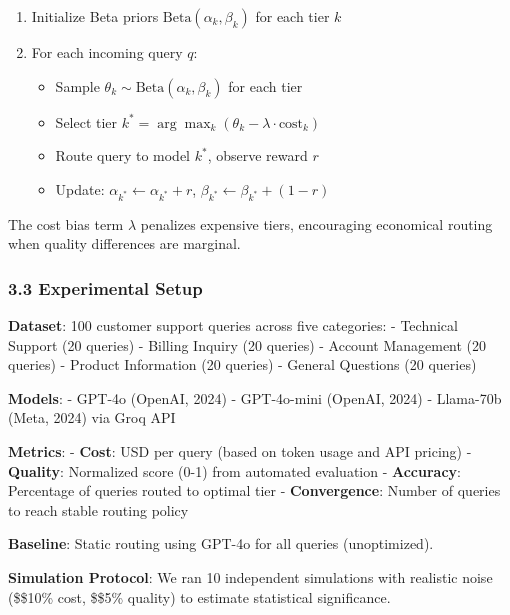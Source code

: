 \documentclass[
]{article}
\providecommand{\tightlist}{%
  \setlength{\itemsep}{0pt}\setlength{\parskip}{0pt}}
\begin{document}
\begin{enumerate}
\def\labelenumi{\arabic{enumi}.}
\tightlist
\item
  Initialize Beta priors \(\text{Beta}(\alpha_k, \beta_k)\) for each
  tier \(k\)
\item
  For each incoming query \(q\):

  \begin{itemize}
  \tightlist
  \item
    Sample \(\theta_k \sim \text{Beta}(\alpha_k, \beta_k)\) for each
    tier
  \item
    Select tier
    \(k^* = \arg\max_k (\theta_k - \lambda \cdot \text{cost}_k)\)
  \item
    Route query to model \(k^*\), observe reward \(r\)
  \item
    Update: \(\alpha_{k^*} \leftarrow \alpha_{k^*} + r\),
    \(\beta_{k^*} \leftarrow \beta_{k^*} + (1-r)\)
  \end{itemize}
\end{enumerate}

The cost bias term \(\lambda\) penalizes expensive tiers, encouraging
economical routing when quality differences are marginal.

\hypertarget{experimental-setup}{%
\subsubsection{3.3 Experimental Setup}\label{experimental-setup}}

\textbf{Dataset}: 100 customer support queries across five categories: -
Technical Support (20 queries) - Billing Inquiry (20 queries) - Account
Management (20 queries) - Product Information (20 queries) - General
Questions (20 queries)

\textbf{Models}: - GPT-4o (OpenAI, 2024) - GPT-4o-mini (OpenAI, 2024) -
Llama-70b (Meta, 2024) via Groq API

\textbf{Metrics}: - \textbf{Cost}: USD per query (based on token usage
and API pricing) - \textbf{Quality}: Normalized score (0-1) from
automated evaluation - \textbf{Accuracy}: Percentage of queries routed
to optimal tier - \textbf{Convergence}: Number of queries to reach
stable routing policy

\textbf{Baseline}: Static routing using GPT-4o for all queries
(unoptimized).

\textbf{Simulation Protocol}: We ran 10 independent simulations with
realistic noise (\$\pm\$10\% cost, \$\pm\$5\% quality) to estimate
statistical significance.
\end{document}
